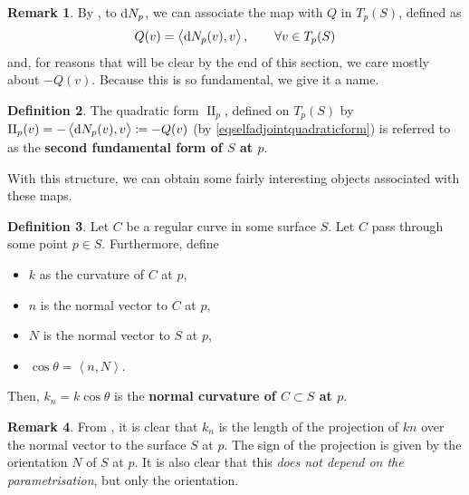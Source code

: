 \documentclass{amsart} %
\theoremstyle{mytheoremstyle}
\theoremstyle{definition}
\newtheorem{definition}{Definition}[section]
\newtheorem{remark}[definition]{Remark}
\numberwithin{equation}{section}
\DeclareMathOperator{\II}{II}
\DeclareMathOperator{\1}{\mathbbm{1}}
\DeclareMathOperator{\D}{\dif}
\newcommand{\innerproduct}[2]{\left\langle #1,#2 \right\rangle}
\begin{document}
\begin{remark}
	By , to $\D N_p$, we can associate the map with $Q $ in $T_p (S)$, defined as
	\begin{align}
		\label{eqselfadjointquadraticform}
		Q(v) = \innerproduct{\D N_p (v)}{v}, \qquad \forall v \in T_p (S)
	\end{align}
	and, for reasons that will be clear by the end of this section, we care mostly about $-Q(v)$. Because this is so fundamental, we give it a name.
\end{remark}

\begin{definition}
	\label{defsecondfundamentalform}
	The quadratic form $\II_p$, defined on $T_p (S)$ by $\II_p (v) = - \innerproduct{\D N_p (v)}{v} \coloneqq - Q(v) $ (by \eqref{eqselfadjointquadraticform}) is referred to as the \textbf{second fundamental form of $S$ at $p$}.
\end{definition}

With this structure, we can obtain some fairly interesting objects associated with these maps.

\begin{definition}
	\label{defnormalcurvature}
	Let $C$ be a regular curve in some surface $S$. Let $C$ pass through some point $p \in S$. Furthermore, define
	\begin{itemize}
		\item $k$ as the curvature of $C$ at $p$,
		\item $n $ is the normal vector to $C$ at $p$,
		\item $N $ is the normal vector to $S$ at $p$,
		\item $\cos \theta  = \innerproduct{n}{N}$.
	\end{itemize}
	Then, $k_n = k \cos \theta $ is the \textbf{normal curvature of $C \subset S$ at $p$}.
\end{definition}

\begin{remark}
	From , it is clear that $k_n$ is the length of the projection of $kn$ over the normal vector to the surface $S$ at $p$. The sign of the projection is given by the orientation $N$ of $S$ at $p$. It is also clear that this \textit{does not depend on the parametrisation}, but only the orientation.
\end{remark}
\end{document}
